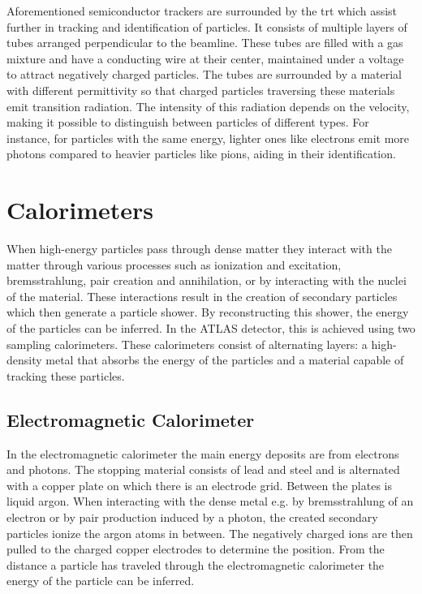 Aforementioned semiconductor trackers are surrounded by the \ac{trt} which assist further in tracking and identification of particles. It consists of multiple layers of tubes arranged perpendicular to the beamline. These tubes are filled with a gas mixture and have a conducting wire at their center, maintained under a voltage to attract negatively charged particles. The tubes are surrounded by a material with different permittivity so that charged particles traversing these materials emit transition radiation. The intensity of this radiation depends on the velocity, making it possible to distinguish between particles of different types. For instance, for particles with the same energy, lighter ones like electrons emit more photons compared to heavier particles like pions, aiding in their identification.

\section{Calorimeters}
When high-energy particles pass through dense matter they interact with the matter through various processes such as ionization and excitation, bremsstrahlung, pair creation and annihilation, or by interacting with the nuclei of the material. These interactions result in the creation of secondary particles which then generate a particle shower. By reconstructing this shower, the energy of the particles can be inferred. In the \ac{ATLAS} detector, this is achieved using two sampling calorimeters. These calorimeters consist of alternating layers: a high-density metal that absorbs the energy of the particles and a material capable of tracking these particles.

\subsection{Electromagnetic Calorimeter}

In the electromagnetic calorimeter the main energy deposits are from electrons and photons. The stopping material consists of lead and steel and is alternated with a copper plate on which there is an electrode grid. Between the plates is liquid argon. When interacting with the dense metal e.g. by bremsstrahlung of an electron or by pair production induced by a photon, the created secondary particles ionize the argon atoms in between. The negatively charged ions are then pulled to the charged copper electrodes to determine the position. From the distance a particle has traveled through the electromagnetic calorimeter the energy of the particle can be inferred.

